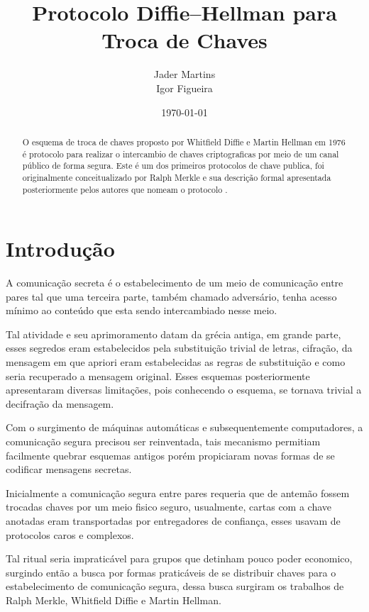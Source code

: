 \documentclass{article}
\title{Protocolo Diffie–Hellman para Troca de Chaves}
\author{Jader Martins\\
        Igor Figueira}
\date{\today}
\begin{document}
\maketitle

\begin{abstract}
    O esquema de troca de chaves proposto por Whitfield Diffie e
    Martin Hellman em 1976 é protocolo para realizar
    o intercambio de chaves criptograficas por meio de um canal público
    de forma segura\cite{Diffie}. Este é um dos primeiros protocolos de
    chave publica, foi originalmente conceitualizado por Ralph Merkle
    e sua descrição formal apresentada posteriormente pelos autores que
    nomeam o protocolo \cite{Merkle}.
\end{abstract}

\section{Introdução}%
\label{sec:introducao}
A comunicação secreta é o estabelecimento de um meio de comunicação entre pares
tal que uma terceira parte, também chamado adversário, tenha acesso mínimo ao
conteúdo que esta sendo intercambiado nesse meio.

Tal atividade e seu aprimoramento datam da grécia
antiga\cite{katz2014introduction}, em grande parte, esses segredos eram
estabelecidos pela substituição trivial de letras, cifração, da mensagem em que
apriori eram estabelecidas as regras de substituição e como seria recuperado a
mensagem original. Esses esquemas posteriormente apresentaram diversas
limitações, pois conhecendo o esquema, se tornava trivial a decifração da
mensagem.

Com o surgimento de máquinas automáticas e subsequentemente computadores, a
comunicação segura precisou ser reinventada\cite{singh1999code}, tais mecanismo
permitiam facilmente quebrar esquemas antigos porém propiciaram novas formas de
se codificar mensagens secretas\cite{Diffie}.


Inicialmente a comunicação segura entre pares requeria que de antemão fossem
trocadas chaves por um meio fisico seguro, usualmente, cartas com a chave
anotadas eram transportadas por entregadores de confiança, esses usavam de
protocolos caros e complexos\cite{matsumoto1987key,Merkle}.

Tal ritual seria impraticável para grupos que detinham pouco poder economico,
surgindo então a busca por formas praticáveis de se distribuir chaves para o
estabelecimento de comunicação segura, dessa busca surgiram os trabalhos de
Ralph Merkle, Whitfield Diffie e Martin Hellman.
\end{document}
